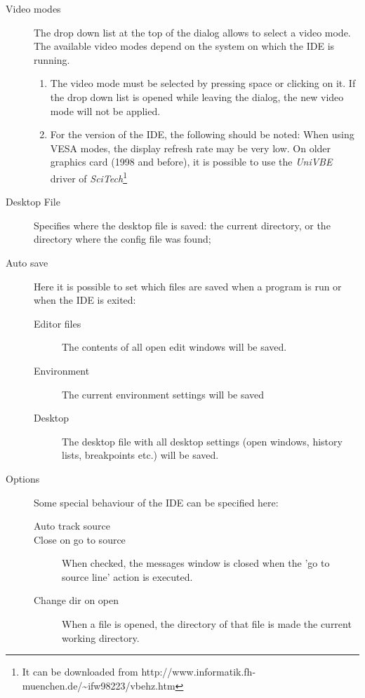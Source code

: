 \begin{description}
\item[Video modes]
The drop down list at the top of the dialog allows to select a video mode.
The available video modes depend on the system on which the IDE
is running.
\begin{remark}
\begin{enumerate}
\item The video mode must be selected by pressing space or clicking
on it. If the drop down list is opened while leaving the dialog,
the new video mode will not be applied.
\item For the \dos version of the IDE, the following should be noted:
When using VESA modes, the display refresh rate may be very low.
On older graphics card (1998 and before), it is possible to use the
{\em UniVBE} driver of {\em SciTech}\footnote{It can be downloaded from
{http://www.informatik.fh-muenchen.de/\~{}ifw98223/vbehz.htm}}
\end{enumerate}
\end{remark}
\item[Desktop File]
Specifies where the desktop file is saved: the current directory, or the
directory where the config file was found;
\item[Auto save]
Here it is possible to set which files are saved when a program is run or
when the IDE is exited:
\begin{description}
\item[Editor files] The contents of all open edit windows will be saved.
\item[Environment] The current environment settings will be saved
\item[Desktop] The desktop file with all desktop settings (open windows,
history lists, breakpoints etc.) will be saved.
\end{description}
\item[Options]
Some special behaviour of the IDE can be specified here:
\begin{description}
\item[Auto track source]
\item[Close on go to source] When checked, the messages window is closed
when the 'go to source line' action is executed.
\item[Change dir on open] When a file is opened, the directory of that file
is made the current working directory.
\end{description}
\end{description}
%
%
